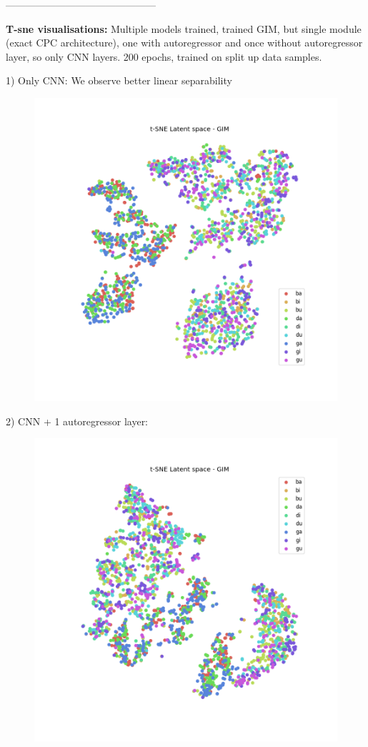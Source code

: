 ---------------------------------------------

\textbf{T-sne visualisations:}
Multiple models trained, trained GIM, but single module (exact CPC architecture), one with autoregressor and once without autoregressor layer, so only CNN layers. 200 epochs, trained on split up data samples.

1) Only CNN: We observe better linear separability
\begin{figure}[h]
	\centering
	\includegraphics[width=0.7\linewidth]{"cpc architecture ONLY CNN t-SNE_latent_space_GIM"}
	\caption{}
	\label{fig:cpc-architecture-only-cnn-t-snelatentspacegim}
\end{figure}

2) CNN + 1 autoregressor layer:
\begin{figure}[h]
	\centering
	\includegraphics[width=0.7\linewidth]{"cpc architecture CNN + GRU t-SNE_latent_space_GIM"}
	\caption{}
	\label{fig:cpc-architecture-cnn--gru-t-snelatentspacegim}
\end{figure}

